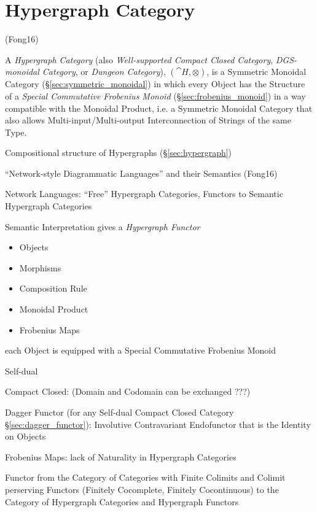 \section{Hypergraph Category}\label{sec:hypergraph_category}

(Fong16)

A \emph{Hypergraph Category} (also \emph{Well-supported Compact Closed
  Category}, \emph{DGS-monoidal Category}, or \emph{Dungeon
  Category}), $(\cat{H}, \otimes)$, is a Symmetric Monoidal Category
(\S\ref{sec:symmetric_monoidal}) in which every Object has the
Structure of a \emph{Special Commutative Frobenius Monoid}
(\S\ref{sec:frobenius_monoid}) in a way compatible with the Monoidal
Product, i.e. a Symmetric Monoidal Category that also allows
Multi-input/Multi-output Interconnection of Strings of the same Type.

Compositional structure of Hypergraphs (\S\ref{sec:hypergraph})

``Network-style Diagrammatic Languages'' and their Semantics (Fong16)

Network Languages: ``Free'' Hypergraph Categories,
Functors to Semantic Hypergraph Categories

Semantic Interpretation gives a \emph{Hypergraph Functor}

\begin{itemize}
  \item Objects
  \item Morphisms
  \item Composition Rule
  \item Monoidal Product
  \item Frobenius Maps
\end{itemize}

each Object is equipped with a Special Commutative Frobenius
Monoid

Self-dual

Compact Closed: (Domain and Codomain can be exchanged ???) %

Dagger Functor (for any Self-dual Compact Closed Category
\S\ref{sec:dagger_functor}): Involutive Contravariant Endofunctor that
is the Identity on Objects

Frobenius Maps: lack of Naturality in Hypergraph Categories

Functor from the Category of Categories with Finite Colimits and
Colimit perserving Functors (Finitely Cocomplete, Finitely
Cocontinuous) to the Category of Hypergraph Categories and Hypergraph
Functors

